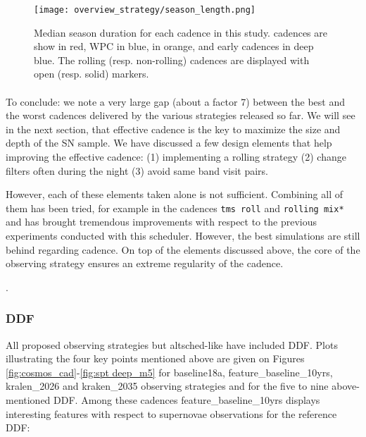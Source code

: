 \begin{figure}
  \begin{center}
    \texttt{[image: overview\_strategy/season\_length.png]}
    \caption{Median season duration for each cadence in this
      study. \altsched cadences are show in red, \opsim WPC in blue,
      \slair in orange, and early cadences in deep blue. The rolling
      (resp. non-rolling) cadences are displayed with open
      (resp. solid) markers. }
    \label{fig:season_length}
  \end{center}
\end{figure}


\paragraph{} To conclude: we note a very large gap (about a factor 7) between
the best and the worst cadences delivered by the various strategies
released so far.  We will see in the next section, that effective
cadence is the key to maximize the size and depth of the SN sample.
We have discussed a few design elements that help improving the effective
cadence: (1) implementing a rolling strategy (2) change filters often
during the night (3) avoid same band visit pairs.

However, each of these elements taken alone is not
sufficient. Combining all of them has been tried, for example in the
\slair cadences {\tt tms\ roll} and {\tt rolling mix*} and has brought
tremendous improvements with respect to the previous experiments
conducted with this scheduler.  However, the best \slair simulations
are still behind \altsched regarding cadence.  On top of the elements
discussed above, the core of the \altsched observing strategy ensures
an extreme regularity of the cadence.

.



\subsubsection{DDF}


All proposed observing strategies but altsched-like have included DDF.
Plots illustrating the four key points mentioned above are given on Figures \ref{fig:cosmos_cad}-\ref{fig:spt deep_m5} for baseline18a, feature\_baseline\_10yrs, kralen\_2026 and kraken\_2035 observing strategies and for the five to nine above-mentioned DDF. Among these cadences feature\_baseline\_10yrs displays interesting features with respect to supernovae observations for the reference DDF:

